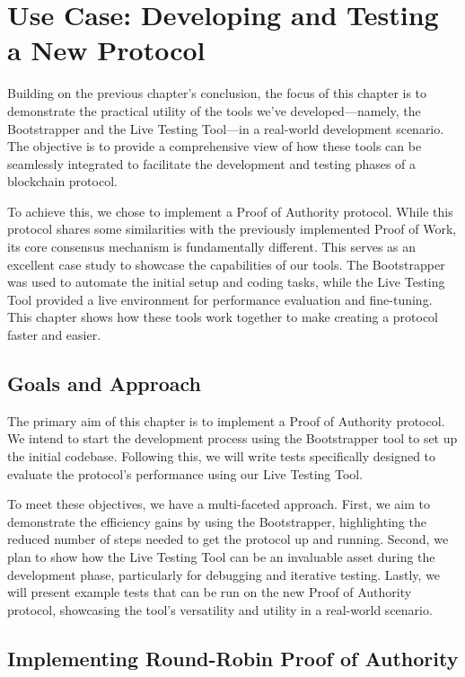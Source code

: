 \chapter{Use Case: Developing and Testing a New Protocol}

Building on the previous chapter's conclusion, the focus of this chapter is to demonstrate the practical utility of the tools we've developed—namely, the Bootstrapper and the Live Testing Tool—in a real-world development scenario. The objective is to provide a comprehensive view of how these tools can be seamlessly integrated to facilitate the development and testing phases of a blockchain protocol.

To achieve this, we chose to implement a Proof of Authority protocol. While this protocol shares some similarities with the previously implemented Proof of Work, its core consensus mechanism is fundamentally different. This serves as an excellent case study to showcase the capabilities of our tools. The Bootstrapper was used to automate the initial setup and coding tasks, while the Live Testing Tool provided a live environment for performance evaluation and fine-tuning. This chapter shows how these tools work together to make creating a protocol faster and easier.



\section{Goals and Approach}
The primary aim of this chapter is to implement a Proof of Authority protocol. We intend to start the development process using the Bootstrapper tool to set up the initial codebase. Following this, we will write tests specifically designed to evaluate the protocol's performance using our Live Testing Tool.

To meet these objectives, we have a multi-faceted approach. First, we aim to demonstrate the efficiency gains by using the Bootstrapper, highlighting the reduced number of steps needed to get the protocol up and running. Second, we plan to show how the Live Testing Tool can be an invaluable asset during the development phase, particularly for debugging and iterative testing. Lastly, we will present example tests that can be run on the new Proof of Authority protocol, showcasing the tool's versatility and utility in a real-world scenario.

\section{Implementing Round-Robin Proof of Authority}

